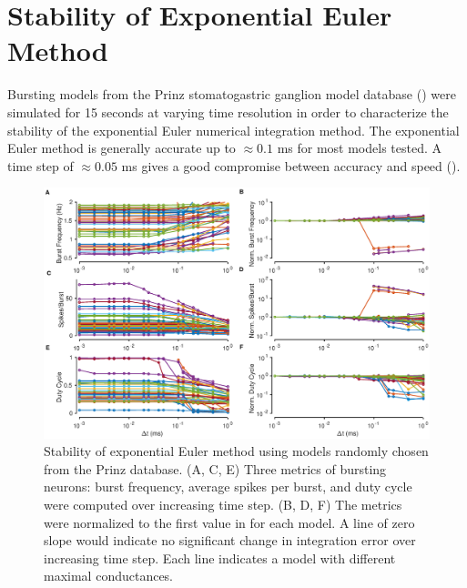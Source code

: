 \documentclass[utf8]{frontiers_suppmat} %
\begin{document}
\section{Stability of Exponential Euler Method}

Bursting models from the Prinz stomatogastric ganglion model database (\cite{prinzAlternativeHandtuningConductancebased2003}) were simulated for 15 seconds at varying time resolution in order to characterize the stability of the exponential Euler numerical integration method. The exponential Euler method is generally accurate up to $\approx 0.1$ ms for most models tested. A time step of $\approx 0.05$ ms gives a good compromise between accuracy and speed (\cite{prinzAlternativeHandtuningConductancebased2003, prinzSimilarNetworkActivity2004}).
	
\begin{figure}
\centering
\includegraphics[width=1.0\linewidth]{gfx/figure_sup_stability}
\caption{Stability of exponential Euler method using models randomly chosen from the Prinz database. (A, C, E) Three metrics of bursting neurons: burst frequency, average spikes per burst, and duty cycle were computed over increasing time step. (B, D, F) The metrics were normalized to the first value in for each model. A line of zero slope would indicate no significant change in integration error over increasing time step. Each line indicates a model with different maximal conductances.}
\label{fig:figuresupstability}
\end{figure}

\cleardoublepage

\printbibliography
\end{document}

